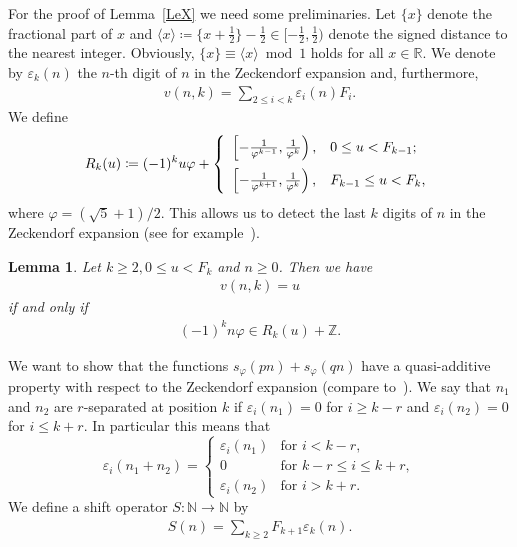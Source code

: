\documentclass[12pt]{amsart}
\newtheorem{lemma}{Lemma}
\begin{document}
For the proof of Lemma~\ref{LeX} we need some preliminaries.
Let $\{x\}$ denote the fractional part of $x$ and $\langle x\rangle \coloneqq \{x + \frac{1}{2}\}-\frac{1}{2} \in [-\frac{1}{2},\frac{1}{2})$ 
denote the signed distance to the nearest integer.
Obviously, $\{x\} \equiv \langle x \rangle \bmod 1$ holds for all $x\in {\mathbb{R}}$.
We denote by $\varepsilon_k(n)$ the $n$-th digit of $n$ in the Zeckendorf expansion and, furthermore, 
\begin{align*}
  v(n,k) = \sum_{2 \leq i < k} \varepsilon_i(n) F_i.
\end{align*}
We define
\begin{align*}
  R_k(u) \coloneqq (-1)^k u \varphi + \left\{\begin{array}{cl} \vspace{2mm} \left[-\frac{1}{\varphi^{k-1}},\frac{1}{\varphi^k}\right), & 0 \leq u < F_{k-1};\\ 
				\left[-\frac{1}{\varphi^{k+1}},\frac{1}{\varphi^k}\right), & F_{k-1} \leq u < F_{k}, \end{array}\right.
\end{align*}
where $\varphi =  (\sqrt{5}+1)/2$.
This allows us to detect the last $k$ digits of $n$ in the Zeckendorf expansion
(see for example~\cite[Proposition~5.7]{Spiegelhofer2014}).

\begin{lemma}
  Let $k\geq 2, 0 \leq u < F_k$ and $n \geq 0 $. Then we have
  \begin{align*}
    v(n,k) = u
  \end{align*}
  if and only if
  \begin{align*}
    (-1)^k n \varphi \in R_k(u) + {\mathbb{Z}}.
  \end{align*}
\end{lemma}

We want to show that the functions $s_\varphi(pn)+s_\varphi(qn)$ have a quasi-additive property with respect to the Zeckendorf expansion (compare to~\cite{KW2016}).
We say that $n_1$ and $n_2$ are $r$-separated at position $k$ if 
$\varepsilon_i(n_1) = 0$ for $i\ge k-r$ and $\varepsilon_i(n_2) = 0$ for $i \le k+r$.
In particular this means that 
\[
\varepsilon_i(n_1+n_2) = \left\{ \begin{array}{ll}
\varepsilon_i(n_1) & \mbox{for $i < k-r$}, \\
0 & \mbox{for $k-r\le i \le k+r$}, \\
\varepsilon_i(n_2) & \mbox{for $i > k+r$}.
\end{array}\right.
\]
We define a shift operator $S: \mathbb{N}\to \mathbb{N}$ by
\begin{align*}
  S(n) = \sum_{k\geq 2} F_{k+1} \varepsilon_k(n).
\end{align*}
\end{document}
